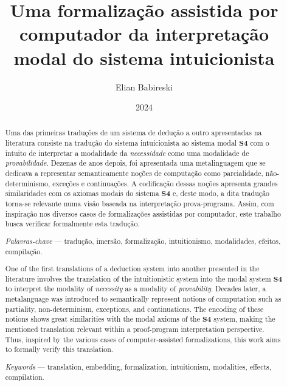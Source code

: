 


    \title{Uma formalização assistida por computador da interpretação modal do sistema intuicionista}
    \author{Elian Babireski}
    \date{2024}

    \maketitle

    
    
    

    \begin{abstract}
        Uma das primeiras traduções de um sistema de dedução a outro apresentadas na literatura consiste na tradução do sistema intuicionista ao sistema modal $\mathbf{S4}$ com o intuito de interpretar a modalidade da \emph{necessidade} como uma modalidade de \emph{provabilidade}. Dezenas de anos depois, foi apresentada uma metalinguagem que se dedicava a representar semanticamente noções de computação como parcialidade, não-determinismo, exceções e continuações. A codificação dessas noções apresenta grandes similaridades com os axiomas modais do sistema $\mathbf{S4}$ e, deste modo, a dita tradução torna-se relevante numa visão baseada na interpretação prova-programa. Assim, com inspiração nos diversos casos de formalizações assistidas por computador, este trabalho busca verificar formalmente esta tradução.

        \textit{Palavras-chave} --- tradução, imersão, formalização, intuitionismo, modalidades, efeitos, compilação.
    \end{abstract}

    \begin{otherlanguage}{english} 
        \begin{abstract}
            One of the first translations of a deduction system into another presented in the literature involves the translation of the intuitionistic system into the modal system $\mathbf{S4}$ to interpret the modality of \emph{necessity} as a modality of \emph{provability}. Decades later, a metalanguage was introduced to semantically represent notions of computation such as partiality, non-determinism, exceptions, and continuations. The encoding of these notions shows great similarities with the modal axioms of the $\mathbf{S4}$ system, making the mentioned translation relevant within a proof-program interpretation perspective. Thus, inspired by the various cases of computer-assisted formalizations, this work aims to formally verify this translation.

            \textit{Keywords} --- translation, embedding, formalization, intuitionism, modalities, effects, compilation.
        \end{abstract}
    \end{otherlanguage}

